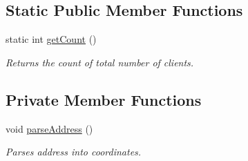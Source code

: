 \subsection*{Static Public Member Functions}
\begin{DoxyCompactItemize}
\item 
static int \hyperlink{classClient_af10ea5348920682f6b7eb8ebcb2c325e}{get\+Count} ()
\begin{DoxyCompactList}\small\item\em Returns the count of total number of clients. \end{DoxyCompactList}\end{DoxyCompactItemize}
\subsection*{Private Member Functions}
\begin{DoxyCompactItemize}
\item 
void \hyperlink{classClient_a6953fb1cd2e5a4fa87ee08479072a402}{parse\+Address} ()
\begin{DoxyCompactList}\small\item\em Parses address into coordinates. \end{DoxyCompactList}\end{DoxyCompactItemize}

